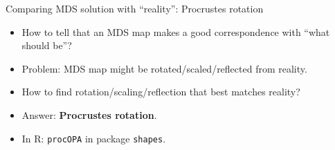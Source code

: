 \begin{frame}[fragile]{Comparing MDS solution with ``reality'':
    Procrustes rotation}
  
  \begin{itemize}
  \item How to tell that an MDS map makes a good correspondence with ``what
    should be''?
  \item Problem: MDS map might be rotated/scaled/reflected from reality.
  \item How to find rotation/scaling/reflection that best matches reality?
  \item Answer: \textbf{Procrustes rotation}.
  \item In R: \texttt{procOPA} in package \texttt{shapes}.
  \end{itemize}
  
\end{frame}

